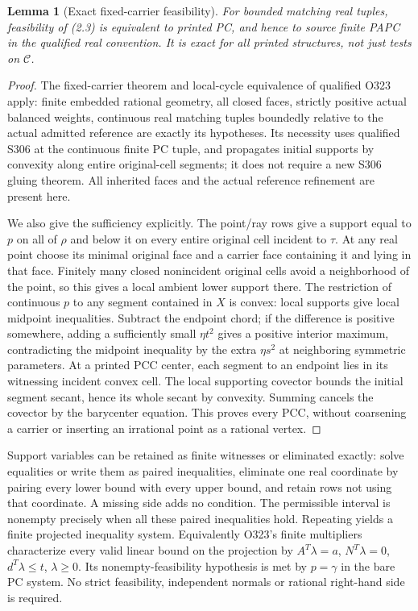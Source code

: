 \documentclass[11pt]{article}
\newtheorem{lemma}[theorem]{Lemma}
\begin{document}
\begin{lemma}[Exact fixed-carrier feasibility]\label{l:rows}
For bounded matching real tuples, feasibility of (2.3) is equivalent to printed PC, and hence to source finite PAPC in the qualified real convention. It is exact for all printed structures, not just tests on $\mathcal C$.
\end{lemma}
\begin{proof}
The fixed-carrier theorem and local-cycle equivalence of qualified O323 apply: finite embedded rational geometry, all closed faces, strictly positive actual balanced weights, continuous real matching tuples boundedly relative to the actual admitted reference are exactly its hypotheses. Its necessity uses qualified S306 at the continuous finite PC tuple, and propagates initial supports by convexity along entire original-cell segments; it does not require a new S306 gluing theorem. All inherited faces and the actual reference refinement are present here.

We also give the sufficiency explicitly. The point/ray rows give a support equal to $p$ on all of $\rho$ and below it on every entire original cell incident to $\tau$. At any real point choose its minimal original face and a carrier face containing it and lying in that face. Finitely many closed nonincident original cells avoid a neighborhood of the point, so this gives a local ambient lower support there. The restriction of continuous $p$ to any segment contained in $X$ is convex: local supports give local midpoint inequalities. Subtract the endpoint chord; if the difference is positive somewhere, adding a sufficiently small $\eta t^2$ gives a positive interior maximum, contradicting the midpoint inequality by the extra $\eta s^2$ at neighboring symmetric parameters. At a printed PCC center, each segment to an endpoint lies in its witnessing incident convex cell. The local supporting covector bounds the initial segment secant, hence its whole secant by convexity. Summing cancels the covector by the barycenter equation. This proves every PCC, without coarsening a carrier or inserting an irrational point as a rational vertex.
\end{proof}

Support variables can be retained as finite witnesses or eliminated exactly: solve equalities or write them as paired inequalities, eliminate one real coordinate by pairing every lower bound with every upper bound, and retain rows not using that coordinate. A missing side adds no condition. The permissible interval is nonempty precisely when all these paired inequalities hold. Repeating yields a finite projected inequality system. Equivalently O323's finite multipliers characterize every valid linear bound on the projection by $A^T\lambda=a$, $N^T\lambda=0$, $d^T\lambda\leq t$, $\lambda\geq0$. Its nonempty-feasibility hypothesis is met by $p=\gamma$ in the bare PC system. No strict feasibility, independent normals or rational right-hand side is required.
\end{document}
